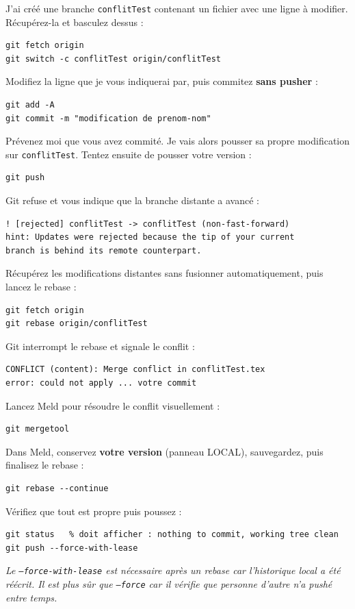 \documentclass[11pt,a4paper]{article}
\begin{document}
\begin{enumerate}
	J'ai créé une branche \texttt{conflitTest} contenant 
	un fichier avec une ligne à modifier. Récupérez-la et basculez dessus :
	\begin{lstlisting}[style=bashstyle]
git fetch origin
git switch -c conflitTest origin/conflitTest
	\end{lstlisting}
	Modifiez la ligne que je vous indiquerai par, puis commitez 
	\textbf{sans pusher} :
	\begin{lstlisting}[style=bashstyle]
git add -A
git commit -m "modification de prenom-nom"
	\end{lstlisting}
	Prévenez moi que vous avez commité. Je vais alors pousser 
	sa propre modification sur \texttt{conflitTest}. Tentez ensuite 
	de pousser votre version :
	\begin{lstlisting}[style=bashstyle]
git push
	\end{lstlisting}
	Git refuse et vous indique que la branche distante a avancé :
	\begin{lstlisting}[style=plainstyle]
! [rejected] conflitTest -> conflitTest (non-fast-forward)
hint: Updates were rejected because the tip of your current 
branch is behind its remote counterpart.
	\end{lstlisting}
	Récupérez les modifications distantes sans fusionner automatiquement, 
	puis lancez le rebase :
	\begin{lstlisting}[style=bashstyle]
git fetch origin
git rebase origin/conflitTest
	\end{lstlisting}
	Git interrompt le rebase et signale le conflit :
	\begin{lstlisting}[style=plainstyle]
CONFLICT (content): Merge conflict in conflitTest.tex
error: could not apply ... votre commit
	\end{lstlisting}
	Lancez Meld pour résoudre le conflit visuellement :
	\begin{lstlisting}[style=bashstyle]
git mergetool
	\end{lstlisting}
	Dans Meld, conservez \textbf{votre version} (panneau LOCAL), 
	sauvegardez, puis finalisez le rebase :
	\begin{lstlisting}[style=bashstyle]
git rebase --continue
	\end{lstlisting}
	Vérifiez que tout est propre puis poussez :
	\begin{lstlisting}[style=bashstyle]
git status   % doit afficher : nothing to commit, working tree clean
git push --force-with-lease
	\end{lstlisting}
	\textit{Le \texttt{--force-with-lease} est nécessaire après un rebase 
		car l'historique local a été réécrit. Il est plus sûr que 
		\texttt{--force} car il vérifie que personne d'autre n'a pushé 
		entre temps.}
	

\end{enumerate}
\end{document}
